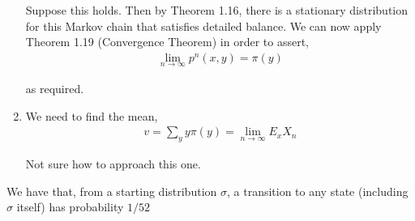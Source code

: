 \documentclass[12pt]{article}
\newenvironment{problem}[2][Problem]{\begin{trivlist}
\item[\hskip \labelsep {\bfseries #1}\hskip \labelsep {\bfseries #2.}]}{\end{trivlist}}
\begin{document}
\begin{enumerate}[label=(\alph*)]
Suppose this holds. Then by Theorem 1.16, there is a stationary distribution for this Markov chain that satisfies detailed balance. We can now apply Theorem 1.19 (Convergence Theorem) in order to assert,
\begin{align*}
\lim_{n \to \infty} p^n(x, y) = \pi(y)
\end{align*}

as required.

\item We need to find the mean,
\begin{align*}
v = \sum_y y \pi(y) = \lim_{n \to \infty} E_xX_n
\end{align*}

Not sure how to approach this one.
\end{enumerate}

\begin{problem}{4}
\end{problem}

We have that, from a starting distribution $\sigma$, a transition to any state (including $\sigma$ itself) has probability $1/52$
\end{document}
